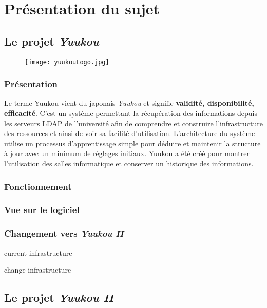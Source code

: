 \chapter{Pr\'esentation du sujet}

\section{Le projet \textit{Yuukou}}

\begin{figure}[!ht]
	\centering
	\texttt{[image: yuukouLogo.jpg]}

\end{figure}

\subsection{Pr\'esentation}

Le terme Yuukou vient du japonais \textit{Yuukou} et signifie \textbf{validit\'e, disponibilit\'e, efficacit\'e}. 
C'est un syst\`eme permettant la r\'ecup\'eration des informations depuis les serveurs LDAP de l'universit\'e afin de comprendre et construire l'infrastructure des ressources et ainsi de voir sa facilit\'e d'utilisation. L'architecture du syst\`eme utilise un processus d'apprentissage simple pour d\'eduire et maintenir la structure \`a jour avec un minimum de r\'eglages initiaux.
Yuukou a \'et\'e cr\'e\'e pour montrer l'utilisation des salles informatique et conserver un historique des informations.

\subsection{Fonctionnement}

\subsection{Vue sur le logiciel}

\subsection{Changement vers \textit{Yuukou II}}

current infrastructure

change infrastructure

\section{Le projet \textit{Yuukou II}}

\clearpage

